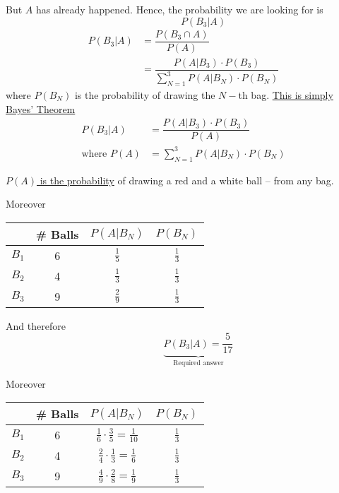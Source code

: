 \documentclass[14pt,fleqn]{extarticle}
\begin{document}
But $A$ has already happened. Hence, the probability we are looking 
for is \[\qquad\qquad P \left(B_3\vert A \right)\]
\newcard 
\begin{align}
	P \left(B_3\vert A \right) &= \dfrac{P \left(B_3\cap A \right)}{P(A)} \\
	&= \dfrac{P \left(A\vert B_3 \right)\cdot P(B_3)}{\sum_{N=1}^3 P \left(A\vert B_N \right)\cdot P \left(B_N \right)}
\end{align}
\newline 
where $P(B_N)$ is the probability of drawing the $N-$th bag.
\newcard 
\underline{This is simply Bayes' Theorem}
\begin{align}
P \left(B_3\vert A \right) &= \dfrac{P \left(A\vert B_3 \right)\cdot P(B_3)}{P(A)} \\
\text{where } P \left(A \right) &= \sum_{N=1}^3 P \left(A\vert B_N \right)\cdot P(B_N) 
\end{align}

\underline{$P(A)$ is the probability} of drawing a red and a white ball -- from any bag. 
\newcard 

Moreover\newline 

\begin{tabular}{|c|c|c|c|}
\hline
	& \# Balls & $P \left(A\vert B_N \right)$ & $P \left(B_N \right)$\\
\hline
	$B_1$ & 6 & $\frac{1}{5}$ & $\frac{1}{3}$ \\
\hline 
	$B_2$ & 4 & $\frac{1}{3}$ & $\frac{1}{3}$\\
\hline
	$B_3$ & 9 & $\frac{2}{9}$ & $\frac{1}{3}$\\
\hline 
\end{tabular}\newline 

And therefore 
\[ \qquad\quad  \underbrace{P \left(B_3\vert A \right) = \frac{5}{17}}_{\text{Required answer}}\]

\newcard 

Moreover \newline 

\begin{tabular}{|c|c|c|c|}
\hline
	& \# Balls & $P \left(A\vert B_N \right)$ & $P \left(B_N \right)$\\
\hline
	$B_1$ & 6 & $\frac{1}{6}\cdot\frac{3}{5}=\frac{1}{10}$ & $\frac{1}{3}$ \\
\hline 
	$B_2$ & 4 & $\frac{2}{4}\cdot\frac{1}{3}=\frac{1}{6}$ & $\frac{1}{3}$\\
\hline
	$B_3$ & 9 & $\frac{4}{9}\cdot\frac{2}{8} = \frac{1}{9}$ & $\frac{1}{3}$\\
\hline 
\end{tabular}
\end{document}
